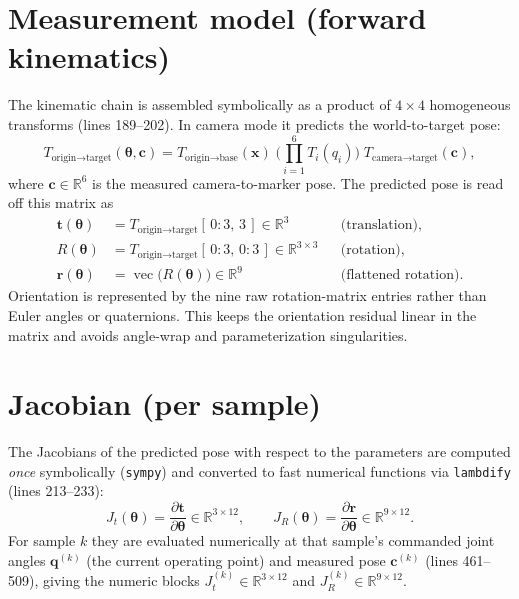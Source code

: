 \documentclass[11pt]{article}
\newcommand{\R}{\mathbb{R}}
\newcommand{\vecop}{\operatorname{vec}}
\begin{document}
\section{Measurement model (forward kinematics)}
The kinematic chain is assembled symbolically as a product of $4\times4$ homogeneous
transforms (lines 189--202). In camera mode it predicts the world-to-target pose:
\begin{equation}
T_{\text{origin}\to\text{target}}(\bm{\theta}, \bm{c})
= T_{\text{origin}\to\text{base}}(\bm{x})\;
\Bigg(\prod_{i=1}^{6} T_i(q_i)\Bigg)\;
T_{\text{camera}\to\text{target}}(\bm{c}),
\end{equation}
where $\bm{c}\in\R^6$ is the measured camera-to-marker pose. The predicted pose is
read off this matrix as
\begin{align}
\bm{t}(\bm{\theta}) &= T_{\text{origin}\to\text{target}}[\,0\!:\!3,\,3\,] \in \R^{3}
&&\text{(translation)},\\
R(\bm{\theta})       &= T_{\text{origin}\to\text{target}}[\,0\!:\!3,\,0\!:\!3\,] \in \R^{3\times3}
&&\text{(rotation)},\\
\bm{r}(\bm{\theta})  &= \vecop\big(R(\bm{\theta})\big) \in \R^{9}
&&\text{(flattened rotation)}.
\end{align}
Orientation is represented by the nine raw rotation-matrix entries rather than
Euler angles or quaternions. This keeps the orientation residual linear in the
matrix and avoids angle-wrap and parameterization singularities.

\section{Jacobian (per sample)}
The Jacobians of the predicted pose with respect to the parameters are computed
\emph{once} symbolically (\texttt{sympy}) and converted to fast numerical functions
via \texttt{lambdify} (lines 213--233):
\begin{equation}
J_t(\bm{\theta}) = \frac{\partial \bm{t}}{\partial \bm{\theta}} \in \R^{3\times12},
\qquad
J_R(\bm{\theta}) = \frac{\partial \bm{r}}{\partial \bm{\theta}} \in \R^{9\times12}.
\end{equation}
For sample $k$ they are evaluated numerically at that sample's commanded joint
angles $\bm{q}^{(k)}$ (the current operating point) and measured pose $\bm{c}^{(k)}$
(lines 461--509), giving the numeric blocks $J_t^{(k)} \in \R^{3\times12}$ and
$J_R^{(k)} \in \R^{9\times12}$.
\end{document}
